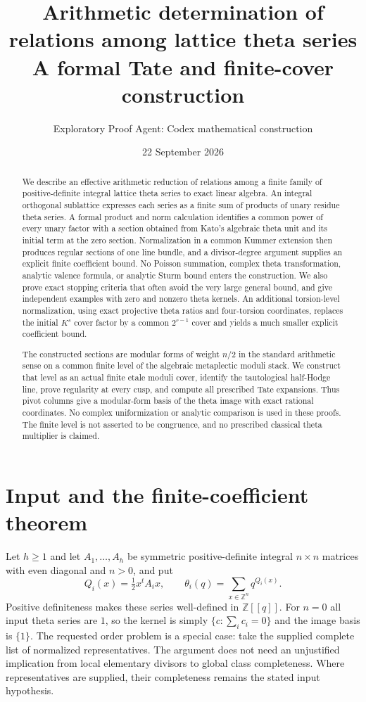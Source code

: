 \documentclass[11pt]{article}
\title{Arithmetic determination of relations among lattice theta series\\
\large A formal Tate and finite-cover construction}
\author{Exploratory Proof Agent: Codex mathematical construction}
\date{22 September 2026}
\theoremstyle{remark}\newtheorem{remark}[theorem]{Remark}
\newcommand{\Z}{\mathbb Z}\newcommand{\Q}{\mathbb Q}
\begin{document}
\maketitle
\begin{abstract}
We describe an effective arithmetic reduction of relations among a finite family
of positive-definite integral lattice theta series to exact linear algebra.
An integral orthogonal sublattice expresses each series as a finite sum of
products of unary residue theta series. A formal product and norm calculation
identifies a common power of every unary factor with a section obtained from
Kato's algebraic theta unit and its initial term at the zero section. Normalization in a
common Kummer extension then produces regular sections of one line bundle,
and a divisor-degree argument supplies an explicit finite coefficient bound.
No Poisson summation, complex theta transformation, analytic valence formula,
or analytic Sturm bound enters the construction. We also prove exact stopping
criteria that often avoid the very large general bound, and give independent
examples with zero and nonzero theta kernels. An additional torsion-level
normalization, using exact projective theta ratios and four-torsion
coordinates, replaces the initial $K^s$ cover factor by a common
$2^{r-1}$ cover and yields a much smaller explicit coefficient bound.

The constructed sections are modular forms of weight $n/2$ in the
standard arithmetic sense on a common finite level of the algebraic
metaplectic moduli stack. We construct that level as an actual finite
etale moduli cover, identify the tautological half-Hodge line, prove
regularity at every cusp, and compute all prescribed Tate expansions.
Thus pivot columns give a modular-form basis of the theta image with
exact rational coordinates. No complex uniformization or analytic
comparison is used in these proofs. The finite level is not asserted
to be congruence, and no prescribed classical theta multiplier is claimed.
\end{abstract}

\section{Input and the finite-coefficient theorem}
Let $h\geq1$ and let $A_1,\ldots,A_h$ be symmetric positive-definite integral $n\times n$
matrices with even diagonal and $n>0$, and put
\[
 Q_i(x)=\tfrac12x^tA_ix,\qquad
 \theta_i(q)=\sum_{x\in\Z^n}q^{Q_i(x)}.
\]
Positive definiteness makes these series well-defined in $\Z[[q]]$.
For $n=0$ all input theta series are $1$, so the kernel is simply
$\{c:\sum_i c_i=0\}$ and the image basis is $\{1\}$.
The requested order problem is a special case: take the supplied complete
list of normalized representatives. The argument does not need an
unjustified implication from local elementary divisors to global class
completeness. Where representatives are supplied, their completeness remains
the stated input hypothesis.
\end{document}
